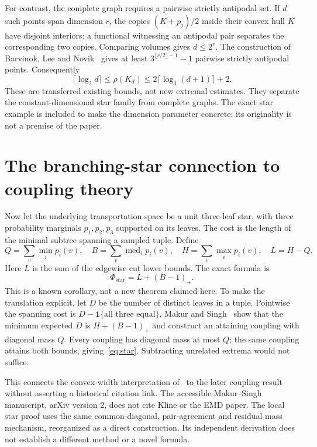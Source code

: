 \documentclass[11pt]{article}
\theoremstyle{definition}\newtheorem{definition}[theorem]{Definition}
\newcommand{\1}{\mathbf 1}
\begin{document}
For contrast, the complete graph requires a pairwise strictly antipodal set.
If $d$ such points span dimension $r$, the copies $(K+p_j)/2$ inside their
convex hull $K$ have disjoint interiors: a functional witnessing an antipodal
pair separates the corresponding two copies. Comparing volumes gives $d\le2^r$.
The construction of Barvinok, Lee and Novik~\cite[Theorem 4.1]{bln} gives at
least $3^{\lfloor r/2\rfloor-1}-1$ pairwise strictly antipodal points. Consequently
\[
 \lceil\log_2d\rceil\le\rho(K_d)
 \le2\lceil\log_3(d+1)\rceil+2.
\]
These are transferred existing bounds, not new extremal estimates. They separate
the constant-dimensional star family from complete graphs. The exact star
example is included to make the dimension parameter concrete; its originality
is not a premise of the paper.

\section{The branching-star connection to coupling theory}\label{sec:branch}
Now let the underlying transportation space be a unit three-leaf star, with
three probability marginals $p_1,p_2,p_3$ supported on its leaves. The cost is
the length of the minimal subtree spanning a sampled tuple. Define
\[
 Q=\sum_v\min_i p_i(v),\quad B=\sum_v\operatorname{med}_i p_i(v),\quad
 H=\sum_v\max_i p_i(v),\quad L=H-Q.
\]
Here $L$ is the sum of the edgewise cut lower bounds. The exact formula is
\begin{equation}\label{eq:star}
 \Phi_{\mathrm{star}}=L+(B-1)_+.
\end{equation}
This is a known corollary, not a new theorem claimed here. To make the
translation explicit, let $D$ be the number of distinct leaves in a tuple.
Pointwise the spanning cost is $D-\1\{\text{all three equal}\}$.
Makur and Singh~\cite[Proposition 1 and Sections III-C1, III-D]{makur} show
that the minimum expected $D$ is $H+(B-1)_+$ and construct an attaining
coupling with diagonal mass $Q$. Every coupling has diagonal mass at most $Q$;
the same coupling attains both bounds, giving~\eqref{eq:star}. Subtracting
unrelated extrema would not suffice.

This connects the convex-width interpretation of~\cite{kline} to the later
coupling result without asserting a historical citation link. The accessible
Makur--Singh manuscript, arXiv version 2, does not cite Kline or the EMD paper.
The local star proof uses the same common-diagonal, pair-agreement and residual
mass mechanism, reorganized as a direct construction. Its independent derivation
does not establish a different method or a novel formula.
\end{document}
